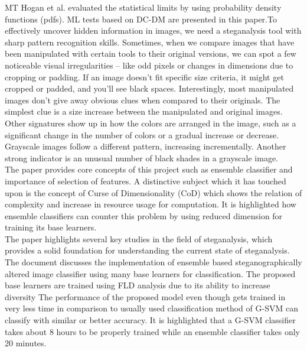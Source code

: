 MT Hogan et al.\cite{3} evaluated the statistical limits by using probability density functions (pdfs). ML tests based on DC-DM are presented in this paper.To effectively uncover hidden information in images, we need a steganalysis tool with sharp pattern recognition skills. Sometimes, when we compare images that have been manipulated with certain tools to their original versions, we can spot a few noticeable visual irregularities – like odd pixels or changes in dimensions due to cropping or padding. If an image doesn't fit specific size criteria, it might get cropped or padded, and you'll see black spaces. Interestingly, most manipulated images don't give away obvious clues when compared to their originals. The simplest clue is a size increase between the manipulated and original images. Other signatures show up in how the colors are arranged in the image, such as a significant change in the number of colors or a gradual increase or decrease. Grayscale images follow a different pattern, increasing incrementally. Another strong indicator is an unusual number of black shades in a grayscale image.\\
The paper\cite{8} provides core concepts of this project such as ensemble classifier and importance of selection of features. A distinctive subject which it has touched upon is the concept of Curse of Dimensionality (CoD) which shows the relation of complexity and increase in  resource usage for computation. It is highlighted how ensemble classifiers can counter this problem by using reduced dimension for training its base learners.\\
The paper\cite{5} highlights several key studies in the field of steganalysis, which provides a solid foundation for understanding the current state of steganalysis. The document discusses the implementation of ensemble based steganographically altered image classifier using many base learners for classification. The proposed base learners are trained using FLD analysis due to its ability to increase diversity The performance of the proposed model even though gets trained in very less time in comparison to usually used classification method of G-SVM can classify with similar or better accuracy. It is highlighted that a G-SVM classifier takes about 8 hours to be properly trained while an ensemble classifier takes only 20 minutes.\\                   
